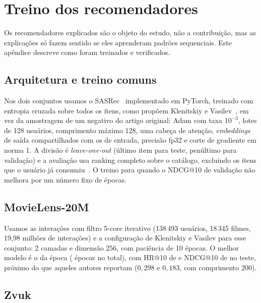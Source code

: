 \section{Treino dos recomendadores}
\label{ap:treino}

Os recomendadores explicados são o objeto do estudo, não a contribuição, mas
as explicações só fazem sentido se eles aprenderam padrões sequenciais. Este
apêndice descreve como foram treinados e verificados.

\subsection{Arquitetura e treino comuns}

Nos dois conjuntos usamos o SASRec~\cite{kang2018sasrec} implementado em
PyTorch, treinado com entropia cruzada sobre todos os itens, como propõem
Klenitskiy e Vasilev~\cite{klenitskiy2023turning}, em vez da amostragem de um
negativo do artigo original: Adam com taxa $10^{-3}$, lotes de 128 usuários,
comprimento máximo 128, uma cabeça de atenção, \emph{embeddings} de saída
compartilhados com os de entrada, precisão fp32 e corte de gradiente em norma
1. A divisão é \emph{leave-one-out} (último item para teste, penúltimo para
validação) e a avaliação usa ranking completo sobre o catálogo, excluindo os
itens que o usuário já consumiu~\cite{krichene2020sampled}. O treino para
quando o NDCG@10 de validação não melhora por um número fixo de épocas.

\subsection{MovieLens-20M}

Usamos as interações com filtro 5-core iterativo (138\,493 usuários, 18\,345
filmes, 19{,}98 milhões de interações) e a configuração de Klenitskiy e
Vasilev para esse conjunto: 2 camadas e dimensão 256, com paciência de 10
épocas. O melhor modelo é o da época 
( épocas no total), com HR@10 de  e
NDCG@10 de  no teste, próximo do que aqueles autores
reportam ($0{,}298$ e $0{,}183$, com comprimento 200).

\subsection{Zvuk}

